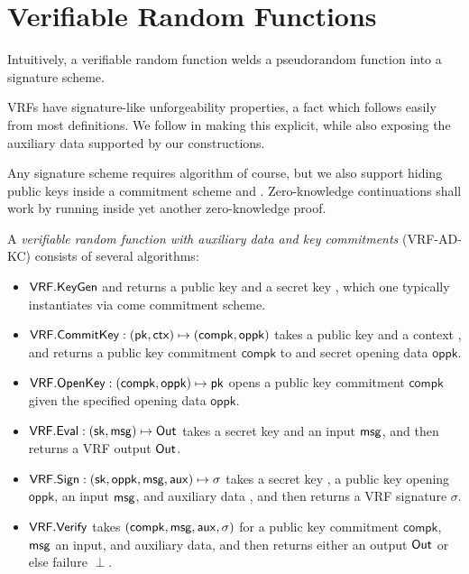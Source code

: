 
\section{Verifiable Random Functions}
\label{sec:vrf}

Intuitively, a verifiable random function welds a pseudorandom function into a signature scheme.

VRFs have signature-like unforgeability properties, a fact which follows easily from most definitions. 
We follow \cite{agg_dkg} in making this explicit, while also
 exposing the auxiliary data supported by our constructions. 

\def\compk{\ensuremath{\mathsf{compk}}\xspace}
\def\openpk{\ensuremath{\mathsf{oppk}}\xspace}
\newcommand\CommitKey{\primalgo{CommitKey}}
\newcommand\OpenKey{\primalgo{OpenKey}}

Any signature scheme requires \KeyGen algorithm of course, but we also
support hiding public keys inside a commitment scheme \CommitKey and \OpenKey.
Zero-knowledge continuations shall work by running \OpenKey inside yet another
zero-knowledge proof. 

\begin{definition}
A {\em verifiable random function with auxiliary data and key commitments} (VRF-AD-KC) consists of several algorithms:
\begin{itemize}
\item ${\mathsf{VRF}}.{\mathsf{KeyGen}}$ and returns a public key \pk and a secret key \sk, which one typically instantiates via come commitment scheme. 
%
\item $\VRF.\CommitKey : (\pk,\ctx) \mapsto (\compk,\openpk)$ takes a public key \pk and a context \ctx, and returns a public key commitment \compk to \sk and secret opening data \openpk.
\item $\VRF.\OpenKey : (\compk,\openpk) \mapsto \pk$ opens a public key commitment \compk given the specified opening data \openpk.
%
\item ${\mathsf{VRF}}.{\mathsf{Eval}} : (\mathsf{sk},\mathsf{msg}) \mapsto {\ensuremath{\mathsf{Out}}}$ takes a secret key \sk and an input $\mathsf{msg}$, and then returns a VRF output ${\mathsf{Out}}$.
\item $\VRF.\Sign : (\sk,\openpk,\msg,\aux) \mapsto \sigma$ takes a secret key \sk, a public key opening \openpk, an input $\mathsf{msg}$, and auxiliary data \aux, and then returns a VRF signature $\sigma$.
\item ${\mathsf{VRF}}.{\mathsf{Verify}}$ takes $(\compk,\msg,\aux,\sigma)$ for a public key commitment \compk, $\mathsf{msg}$ an input, and \aux auxiliary data, and then returns either an output ${\mathsf{Out}}$ or else failure $\perp$.
\end{itemize}
\end{definition}

